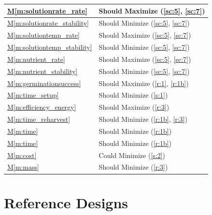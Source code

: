 \documentclass{../tex/report}
\newcommand{\mref}[1]{\hyperref[#1]{M\ref{#1}}}
\begin{document}
\begin{tabular}{|l|p{14.35cm}|}
    \mref{m:solutionrate_rate}          & Should Maximize           \hfill (\ref{sc:5}, \ref{sc:7})             \\ \hline
    \mref{m:solutionrate_stability}     & Should Minimize           \hfill (\ref{sc:5}, \ref{sc:7})             \\ \hline
    \mref{m:solutiontemp_rate}          & Should Maximize           \hfill (\ref{sc:5}, \ref{sc:7})             \\ \hline
    \mref{m:solutiontemp_stability}     & Should Minimize           \hfill (\ref{sc:5}, \ref{sc:7})             \\ \hline
    \mref{m:nutrient_rate}              & Should Maximize           \hfill (\ref{sc:5}, \ref{sc:7})             \\ \hline
    \mref{m:nutrient_stability}         & Should Minimize           \hfill (\ref{sc:5}, \ref{sc:7})             \\ \hline
    \mref{m:germinationsuccess}         & Should Maximize           \hfill (\ref{r:1}, \ref{r:1b})              \\ \hline
    \mref{m:time_setup}                 & Should Minimize           \hfill (\ref{s:1})                          \\ \hline
    \mref{m:efficiency_energy}          & Should Maximize           \hfill (\ref{r:3})                          \\ \hline
    \mref{m:time_reharvest}             & Should Minimize           \hfill (\ref{r:1b}, \ref{r:3})              \\ \hline
    \mref{m:time}                       & Should Minimize           \hfill (\ref{r:1b})                         \\ \hline
    \mref{m:time}                       & Should Minimize           \hfill (\ref{r:1b})                         \\ \hline
    \mref{m:cost}                       & Could Minimize            \hfill (\ref{s:2})                          \\ \hline
    \mref{m:mass}                       & Should Minimize           \hfill (\ref{r:3})                          \\ \hline
\end{tabular}


\clearpage

\section{Reference Designs}
\end{document}
